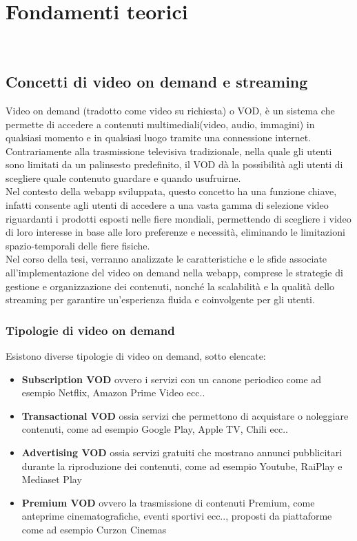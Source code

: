 \chapter{Fondamenti teorici}
\label{cap:fondamentiteorici}
\\

\section{Concetti di video on demand e streaming}
Video on demand (tradotto come video su richiesta) o VOD, è un sistema che permette di accedere a contenuti multimediali(video, audio, immagini) 
in qualsiasi momento e in qualsiasi luogo tramite una connessione internet.
Contrariamente alla trasmissione televisiva tradizionale, nella quale gli utenti sono limitati da un palinsesto predefinito, 
il VOD dà la possibilità agli utenti di scegliere quale contenuto guardare e quando usufruirne.\\
Nel contesto della webapp sviluppata, questo concetto ha una funzione chiave, infatti consente agli utenti di accedere a una vasta gamma di selezione video riguardanti 
i prodotti esposti nelle fiere mondiali, 
permettendo di scegliere i video di loro interesse in base alle loro preferenze e necessità, eliminando le limitazioni spazio-temporali delle fiere fisiche.\\
Nel corso della tesi, verranno analizzate le caratteristiche e le sfide associate all'implementazione del video on demand nella webapp, comprese le strategie 
di gestione e organizzazione dei contenuti, nonché la scalabilità e la qualità dello streaming per garantire un'esperienza fluida e coinvolgente per gli utenti.
\subsection{Tipologie di video on demand}
Esistono diverse tipologie di video on demand, sotto elencate:

\begin{itemize}
    \item \textbf{Subscription VOD} ovvero i servizi con un canone periodico come ad esempio Netflix, Amazon Prime Video ecc..\\
    \item \textbf{Transactional VOD} ossia servizi che permettono di acquistare o noleggiare contenuti, come ad esempio Google Play, Apple TV, Chili ecc..\\
    \item \textbf{Advertising VOD} ossia servizi gratuiti che mostrano annunci pubblicitari durante la riproduzione dei contenuti, come ad esempio Youtube, RaiPlay e Mediaset Play\\
    \item \textbf{Premium VOD} ovvero la trasmissione di contenuti Premium, come anteprime cinematografiche, eventi sportivi ecc.., proposti da piattaforme come ad esempio Curzon Cinemas\\
\end{itemize}

